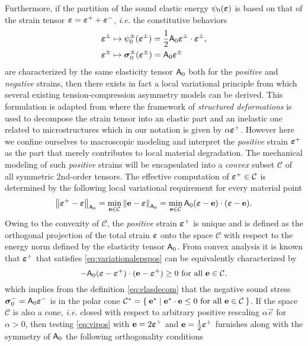 Furthermore, if the partition of the sound elastic energy $\psi_0(\eps)$ is based on that of the strain tensor $\eps=\eps^++\eps^-$, \emph{i.e.} the constitutive behaviors
\begin{equation} \label{eq:elasdecom}
\begin{aligned}
\eps^\pm &\mapsto \psi_0^\pm(\eps^\pm)=\frac{1}{2}\tens{A}_0\eps^\pm\cdot\eps^\pm, \\
\eps^\pm &\mapsto \sig_0^\pm(\eps^\pm)=\tens{A}_0\eps^\pm
\end{aligned}
\end{equation}
are characterized by the same elasticity tensor $\mathsf{A}_0$ both for the \emph{positive} and \emph{negative} strains, then there exists in fact a local variational principle from which several existing tension-compression asymmetry models can be derived. This formulation is adapted from \cite{FreddiRoyer-Carfagni:2010} where the framework of \emph{structured deformations} is used to decompose the strain tensor into an elastic part and an inelastic one related to microstructures which in our notation is given by $\alpha\eps^+$. However here we confine ourselves to macroscopic modeling and interpret the \emph{positive} strain $\eps^+$ as the part that merely contributes to local material degradation. The mechanical modeling of such \emph{positive} strains will be encapsulated into a \emph{convex} subset $\mathcal{C}$ of all symmetric 2nd-order tensors. The effective computation of $\eps^+\in\mathcal{C}$ is determined by the following local variational requirement for every material point
\begin{equation} \label{eq:variationalepspos}
\norm{\eps^+-\eps}_{\tens{A}_0}=\min_{\vec{e}\in\mathcal{C}}\norm{\vec{e}-\eps}_{\tens{A}_0}=\min_{\vec{e}\in\mathcal{C}}\tens{A}_0(\eps-\vec{e})\cdot(\eps-\vec{e}).
\end{equation}
Owing to the convexity of $\mathcal{C}$, the \emph{positive} strain $\eps^+$ is unique and is defined as the orthogonal projection of the total strain $\eps$ onto the space $\mathcal{C}$ with respect to the energy norm defined by the elasticity tensor $\mathsf{A}_0$. From convex analysis it is known that $\eps^+$ that satisfies \eqref{eq:variationalepspos} can be equivalently characterized by
\begin{equation} \label{eq:vipos}
-\tens{A}_0(\eps-\eps^+)\cdot(\vec{e}-\eps^+)\geq0\text{ for all $\vec{e}\in\mathcal{C}$}.
\end{equation}
which implies from the definition \eqref{eq:elasdecom} that the negative sound stress $\sig_0^-=\tens{A}_0\eps^-$ is in the polar cone $\mathcal{C}^*=\set{\vec{e}^*|\vec{e}^*\cdot\vec{e}\leq 0\text{ for all $\vec{e}\in \mathcal{C}$}}$. If the space $\mathcal{C}$ is also a cone, \emph{i.e.} closed with respect to arbitrary positive rescaling $\alpha\vec{e}$ for $\alpha>0$, then testing \eqref{eq:vipos} with $\vec{e}=2\eps^+$ and $\vec{e}=\frac{1}{2}\eps^+$ furnishes along with the symmetry of $\mathsf{A}_0$ the following orthogonality conditions
